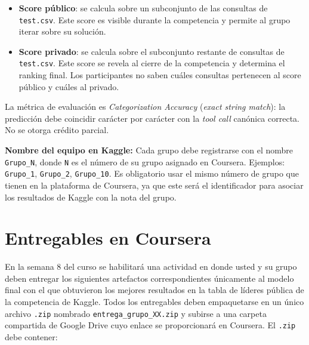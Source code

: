 \documentclass{article}
\begin{document}
\begin{itemize}
    \item \textbf{Score público}: se calcula sobre un subconjunto de las consultas de \texttt{test.csv}. Este score es visible durante la competencia y permite al grupo iterar sobre su solución.
    \item \textbf{Score privado}: se calcula sobre el subconjunto restante de consultas de \texttt{test.csv}. Este score se revela al cierre de la competencia y determina el ranking final. Los participantes no saben cuáles consultas pertenecen al score público y cuáles al privado.
\end{itemize}

La métrica de evaluación es \textit{Categorization Accuracy} (\textit{exact string match}): la predicción debe coincidir carácter por carácter con la \textit{tool call} canónica correcta. No se otorga crédito parcial.

\textbf{Nombre del equipo en Kaggle:} Cada grupo debe registrarse con el nombre \texttt{Grupo\_N}, donde \texttt{N} es el número de su grupo asignado en Coursera. Ejemplos: \texttt{Grupo\_1}, \texttt{Grupo\_2}, \texttt{Grupo\_10}. Es obligatorio usar el mismo número de grupo que tienen en la plataforma de Coursera, ya que este será el identificador para asociar los resultados de Kaggle con la nota del grupo.

\section{Entregables en Coursera}

En la semana 8 del curso se habilitará una actividad en donde usted y su grupo deben entregar los siguientes
artefactos correspondientes únicamente al modelo final con el que obtuvieron los mejores resultados en la
tabla de líderes pública de la competencia de Kaggle. Todos los entregables deben empaquetarse en un único archivo \texttt{.zip} nombrado \texttt{entrega\_grupo\_XX.zip} y subirse a una carpeta compartida de Google Drive cuyo enlace se proporcionará en Coursera. El \texttt{.zip} debe contener:
\end{document}
